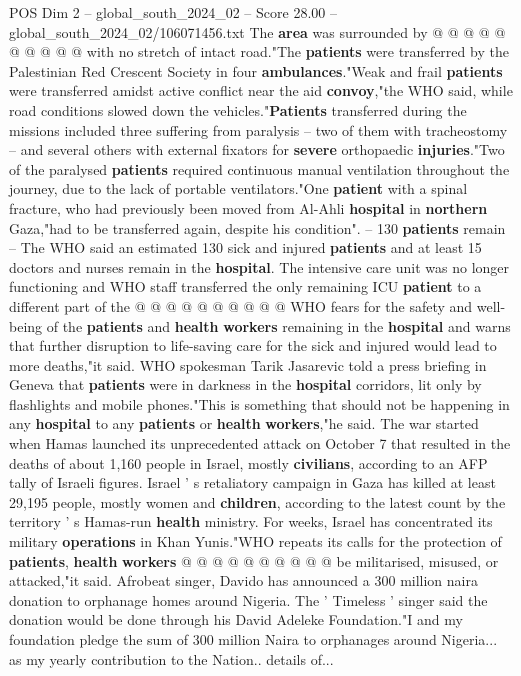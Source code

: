 \begin{textsample}{POS Dim 2 – global\_south\_2024\_02 – Score 28.00 – global\_south\_2024\_02/106071456.txt}
The \textbf{area} was surrounded by @ @ @ @ @ @ @ @ @ @ with no stretch of intact road."The \textbf{patients} were transferred by the Palestinian Red Crescent Society in four \textbf{ambulances}."Weak and frail \textbf{patients} were transferred amidst active conflict near the aid \textbf{convoy},"the WHO said, while road conditions slowed down the vehicles."\textbf{Patients} transferred during the missions included three suffering from paralysis -- two of them with tracheostomy -- and several others with external fixators for \textbf{severe} orthopaedic \textbf{injuries}."Two of the paralysed \textbf{patients} required continuous manual ventilation throughout the journey, due to the lack of portable ventilators."One \textbf{patient} with a spinal fracture, who had previously been moved from Al-Ahli \textbf{hospital} in \textbf{northern} Gaza,"had to be transferred again, despite his condition". -- 130 \textbf{patients} remain -- The WHO said an estimated 130 sick and injured \textbf{patients} and at least 15 doctors and nurses remain in the \textbf{hospital}.
The intensive care unit was no longer functioning and WHO staff transferred the only remaining ICU \textbf{patient} to a different part of the @ @ @ @ @ @ @ @ @ @ WHO fears for the safety and well-being of the \textbf{patients} and \textbf{health} \textbf{workers} remaining in the \textbf{hospital} and warns that further disruption to life-saving care for the sick and injured would lead to more deaths,"it said.
WHO spokesman Tarik Jasarevic told a press briefing in Geneva that \textbf{patients} were in darkness in the \textbf{hospital} corridors, lit only by flashlights and mobile phones."This is something that should not be happening in any \textbf{hospital} to any \textbf{patients} or \textbf{health} \textbf{workers},"he said.
The war started when Hamas launched its unprecedented attack on October 7 that resulted in the deaths of about 1,160 people in Israel, mostly \textbf{civilians}, according to an AFP tally of Israeli figures.
Israel ' s retaliatory campaign in Gaza has killed at least 29,195 people, mostly women and \textbf{children}, according to the latest count by the territory ' s Hamas-run \textbf{health} ministry.
For weeks, Israel has concentrated its military \textbf{operations} in Khan Yunis."WHO repeats its calls for the protection of \textbf{patients}, \textbf{health} \textbf{workers} @ @ @ @ @ @ @ @ @ @ be militarised, misused, or attacked,"it said.
Afrobeat singer, Davido has announced a 300 million naira donation to orphanage homes around Nigeria.
The ' Timeless ' singer said the donation would be done through his David Adeleke Foundation."I and my foundation pledge the sum of 300 million Naira to orphanages around Nigeria... as my yearly contribution to the Nation.. details of...

\end{textsample}
